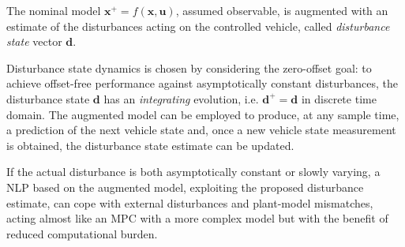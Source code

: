\documentclass[conference]{IEEEtran} %
\renewcommand{\vec}[1]{\boldsymbol{#1}}
\begin{document}
The nominal model $\vec x^+=f(\vec x, \vec u)$, assumed observable, is augmented with an estimate of the disturbances acting on the controlled vehicle, called \emph{disturbance state} vector $\vec d$.

Disturbance state dynamics is chosen by considering the zero-offset goal: to achieve offset-free performance against asymptotically constant disturbances, the disturbance state $\vec d$ has an \emph{integrating} evolution, i.e. $\vec d^+ = \vec d$ in discrete time domain.
The augmented model can be employed to produce, at any sample time, a prediction of the next vehicle state and, once a new vehicle state measurement is obtained, the disturbance state estimate can be updated.

If the actual disturbance is both asymptotically constant or slowly varying, a NLP based on the augmented model, exploiting the proposed disturbance estimate, can cope with external disturbances and plant-model mismatches, acting almost like an MPC with a more complex model but with the benefit of reduced computational burden.


\end{document}
